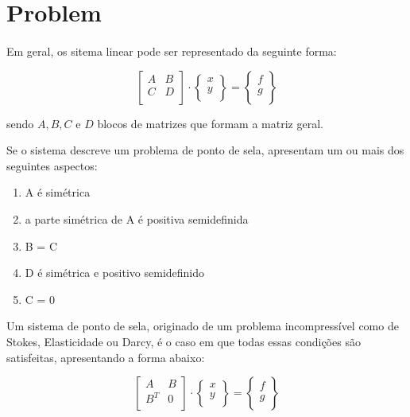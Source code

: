 \documentclass[12pt]{article}
\begin{document}
\section{Problem}
\paragraph{}
Em geral, os sitema linear pode ser representado da seguinte forma: 

\begin{equation} \label{eq:system}
    \begin{bmatrix}
        A & B \\
        C & D \\
    \end{bmatrix}
    \cdot
    \begin{Bmatrix}
        x \\
        y \\
    \end{Bmatrix}
    =
    \begin{Bmatrix}
        f \\
        g \\
    \end{Bmatrix}
\end{equation}

sendo \(A, B, C\) e \(D\) blocos de matrizes que formam a matriz geral.

Se o sistema descreve um problema de ponto de sela, apresentam um ou mais dos seguintes aspectos: 

\begin{enumerate}
  \item A é simétrica
  \item a parte simétrica de A é positiva semidefinida
  \item B = C 
  \item D é simétrica e positivo semidefinido
  \item C = 0 
\end{enumerate}

Um sistema de ponto de sela, originado de um problema incompressível como de Stokes, Elasticidade ou Darcy, é o caso em que todas 
essas condições são satisfeitas, apresentando a forma abaixo:

\begin{equation} \label{eq:system}
    \begin{bmatrix}
        A & B \\
        B^T & 0 \\
    \end{bmatrix}
    \cdot
    \begin{Bmatrix}
        x \\
        y \\
    \end{Bmatrix}
    =
    \begin{Bmatrix}
        f \\
        g \\
    \end{Bmatrix}
\end{equation}
\end{document}
